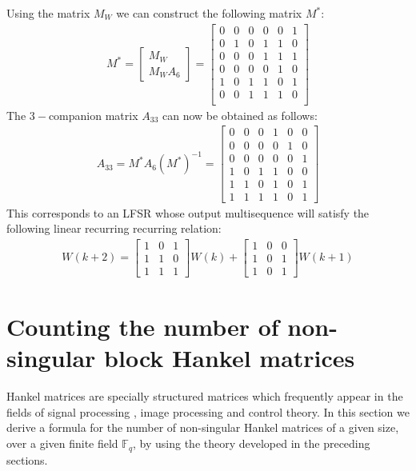 \documentclass[letterpaper, 12 pt]{article}  \usepackage{amssymb}
\newcommand{\F}{\mathbb{F}}
\begin{document}
Using the matrix $M_W$ we can construct the following matrix 
$M^*$: 
\begin{eqnarray*}
 M^* = \left[\begin{matrix}
                  M_W\\
                  M_WA_{6}
                 \end{matrix}\right] = \left[
\begin{matrix}
 0 & 0 & 0 & 0 & 0 & 1\\
 0 & 1 & 0 & 1 & 1 & 0\\
 0 & 0 & 0 & 1 & 1 & 1\\
 0 & 0 & 0 & 0 & 1 & 0\\
 1 & 0 & 1 & 1 & 0 & 1\\
 0 & 0 & 1 & 1 & 1 & 0\\
\end{matrix}\right]
\end{eqnarray*}
The $3-$companion matrix $A_{33}$ can now be obtained as follows:
\begin{eqnarray*}
 A_{33} = M^*A_{6}(M^*)^{-1} = 
\left[\begin{array}{ccc|ccc}
       0 & 0 & 0 & 1 & 0 & 0\\
       0 & 0 & 0 & 0 & 1 & 0\\
       0 & 0 & 0 & 0 & 0 & 1\\
       \hline
       1 & 0 & 1 & 1 & 0 & 0\\
       1 & 1 & 0 & 1 & 0 & 1\\ 
       1 & 1 & 1 & 1 & 0 & 1
      \end{array}\right]
\end{eqnarray*}
This corresponds to an LFSR whose output multisequence will satisfy the
following linear recurring recurring relation: 
\begin{eqnarray*}
W(k+2) = \left[\begin{matrix} 
              1 & 0 & 1\\
              1 & 1 & 0\\
              1 & 1 & 1
             \end{matrix}\right]W(k)+
\left[\begin{matrix} 
              1 & 0 & 0\\
              1 & 0 & 1\\
              1 & 0 & 1
             \end{matrix}\right]W(k+1)
\end{eqnarray*}



 \section{Counting the number of non-singular block Hankel matrices}
Hankel matrices are specially structured matrices which frequently
appear in the fields of signal processing \cite{Hasan}, image
processing and control theory. In this section
we derive a formula for the number of non-singular Hankel matrices of a given
size, over a given finite field $\F_q$, by using the theory developed in the
preceding sections. 
\end{document}
